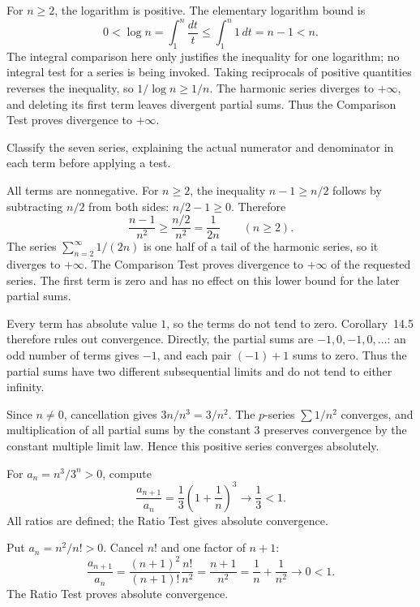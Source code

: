 For $n\ge2$, the logarithm is positive. The elementary logarithm
bound is
\[
 0<\log n=\int_1^n\frac{dt}{t}\le\int_1^n1\,dt=n-1<n.
\]
The integral comparison here only justifies the inequality for one
logarithm; no integral test for a series is being invoked.
Taking reciprocals of positive quantities reverses the inequality,
so $1/\log n\ge1/n$. The harmonic series diverges to $+\infty$,
and deleting its first term leaves divergent partial sums.
Thus the Comparison Test proves divergence to $+\infty$.


\goal Classify the seven series, explaining the actual numerator
and denominator in each term before applying a test.

All terms are nonnegative. For $n\ge2$, the inequality
$n-1\ge n/2$ follows by subtracting $n/2$ from both sides:
$n/2-1\ge0$. Therefore
\[
 \frac{n-1}{n^2}\ge\frac{n/2}{n^2}=\frac1{2n}\qquad(n\ge2).
\]
The series $\sum_{n=2}^{\infty}1/(2n)$ is one half of a tail of
the harmonic series, so it diverges to $+\infty$. The Comparison
Test proves divergence to $+\infty$ of the requested series.
The first term is zero and has no effect on this lower bound for
the later partial sums.

Every term has absolute value $1$, so the terms do not tend to zero.
Corollary~14.5 therefore rules out convergence. Directly, the partial
sums are $-1,0,-1,0,\ldots$: an odd number of terms gives $-1$,
and each pair $(-1)+1$ sums to zero. Thus the partial sums have
two different subsequential limits and do not tend to either infinity.

Since $n\ne0$, cancellation gives
$3n/n^3=3/n^2$. The $p$-series $\sum1/n^2$ converges, and
multiplication of all partial sums by the constant $3$ preserves
convergence by the constant multiple limit law. Hence this positive
series converges absolutely.

For $a_n=n^3/3^n>0$, compute
\[
 \frac{a_{n+1}}{a_n}
 =\frac13\left(1+\frac1n\right)^3
 \longrightarrow\frac13<1.
\]
All ratios are defined; the Ratio Test gives absolute convergence.

Put $a_n=n^2/n!>0$. Cancel $n!$ and one factor of $n+1$:
\[
 \frac{a_{n+1}}{a_n}
 =\frac{(n+1)^2}{(n+1)!}\frac{n!}{n^2}
 =\frac{n+1}{n^2}
 =\frac1n+\frac1{n^2}\longrightarrow0<1.
\]
The Ratio Test proves absolute convergence.

